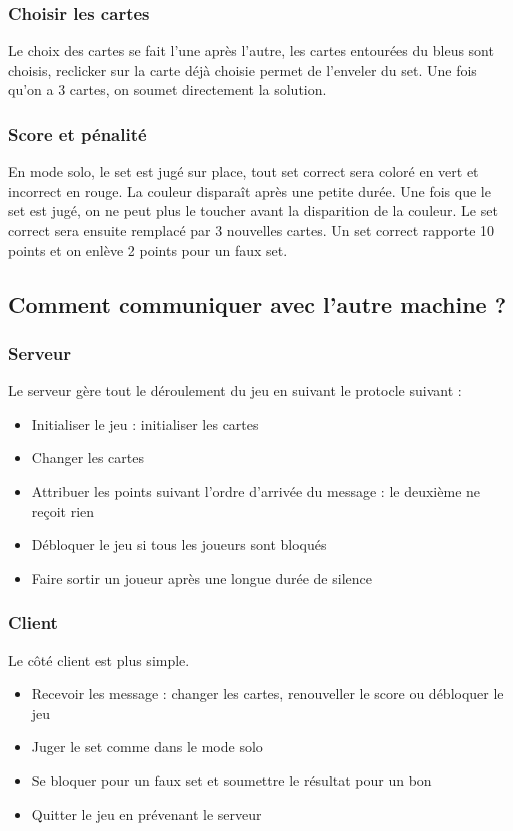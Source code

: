 \documentclass[paper=a4, french]{scrartcl} %
\numberwithin{equation}{section} %
\numberwithin{figure}{section} %
\numberwithin{table}{section} %
\begin{document}
\subsubsection{Choisir les cartes}
Le choix des cartes se fait l'une après l'autre, les cartes entourées du bleus sont choisis, reclicker sur la carte déjà choisie permet de l'enveler du set. Une fois qu'on a 3 cartes, on soumet directement la solution.

\subsubsection{Score et pénalité}
En mode solo, le set est jugé sur place, tout set correct sera coloré en vert et incorrect en rouge. La couleur disparaît après une petite durée. Une fois que le set est jugé, on ne peut plus le toucher avant la disparition de la couleur. Le set correct sera ensuite remplacé par 3 nouvelles cartes. Un set correct rapporte 10 points et on enlève 2 points pour un faux set.
 
 
\subsection{Comment communiquer avec l'autre machine ?}

\subsubsection{Serveur}
Le serveur gère tout le déroulement du jeu en suivant le protocle suivant : 
\begin{itemize}
\item Initialiser le jeu : initialiser les cartes
\item Changer les cartes 
\item Attribuer les points suivant l'ordre d'arrivée du message : le deuxième ne reçoit rien
\item Débloquer le jeu si tous les joueurs sont bloqués
\item Faire sortir un joueur après une longue durée de silence
\end{itemize}
	
\subsubsection{Client}
Le côté client est plus simple. 
\begin{itemize}
\item Recevoir les message : changer les cartes, renouveller le score ou débloquer le jeu
\item Juger le set comme dans le mode solo
\item Se bloquer pour un faux set et soumettre le résultat pour un bon
\item Quitter le jeu en prévenant le serveur
\end{itemize}
\end{document}
